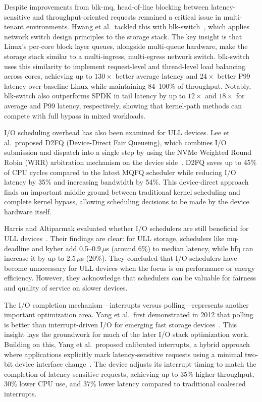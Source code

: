 \documentclass[conference]{IEEEtran}
\begin{document}
Despite improvements from blk-mq, head-of-line blocking between latency-sensitive and throughput-oriented requests remained a critical issue in multi-tenant environments. Hwang et al.\ tackled this with blk-switch~\cite{hwang2021rearchitecting}, which applies network switch design principles to the storage stack. The key insight is that Linux's per-core block layer queues, alongside multi-queue hardware, make the storage stack similar to a multi-ingress, multi-egress network switch. blk-switch uses this similarity to implement request-level and thread-level load balancing across cores, achieving up to $130\times$ better average latency and $24\times$ better P99 latency over baseline Linux while maintaining 84--100\% of throughput. Notably, blk-switch also outperforms SPDK in tail latency by up to $12\times$ and $18\times$ for average and P99 latency, respectively, showing that kernel-path methods can compete with full bypass in mixed workloads.

I/O scheduling overhead has also been examined for ULL devices. Lee et al.\ proposed D2FQ (Device-Direct Fair Queueing), which combines I/O submission and dispatch into a single step by using the NVMe Weighted Round Robin (WRR) arbitration mechanism on the device side~\cite{lee2021d2fq}. D2FQ saves up to 45\% of CPU cycles compared to the latest MQFQ scheduler while reducing I/O latency by 35\% and increasing bandwidth by 54\%. This device-direct approach finds an important middle ground between traditional kernel scheduling and complete kernel bypass, allowing scheduling decisions to be made by the device hardware itself.

Harris and Altiparmak evaluated whether I/O schedulers are still beneficial for ULL devices~\cite{sched2021needed}. Their findings are clear: for ULL storage, schedulers like mq-deadline and kyber add 0.5--0.9\,$\mu$s (around 6\%) to median latency, while bfq can increase it by up to 2.5\,$\mu$s (20\%). They concluded that I/O schedulers have become unnecessary for ULL devices when the focus is on performance or energy efficiency. However, they acknowledge that schedulers can be valuable for fairness and quality of service on slower devices.

The I/O completion mechanism---interrupts versus polling---represents another important optimization area. Yang et al.\ first demonstrated in 2012 that polling is better than interrupt-driven I/O for emerging fast storage devices~\cite{yang2012poll}. This insight lays the groundwork for much of the later I/O stack optimization work. Building on this, Yang et al.\ proposed calibrated interrupts, a hybrid approach where applications explicitly mark latency-sensitive requests using a minimal two-bit device interface change~\cite{yang2022calibrated}. The device adjusts its interrupt timing to match the completion of latency-sensitive requests, achieving up to 35\% higher throughput, 30\% lower CPU use, and 37\% lower latency compared to traditional coalesced interrupts.
\end{document}
